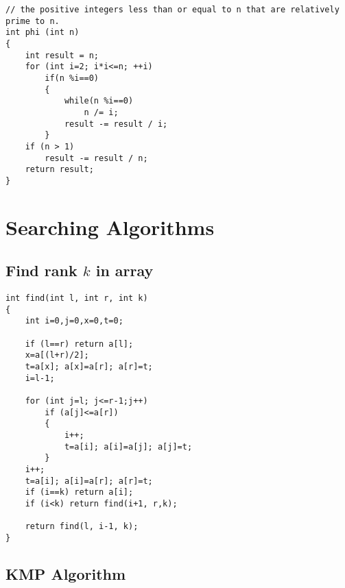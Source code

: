 \documentclass[a4paper]{article}
\begin{document}
\begin{verbatim}
// the positive integers less than or equal to n that are relatively prime to n.
int phi (int n)
{
	int result = n;
	for (int i=2; i*i<=n; ++i)
		if(n %i==0)
		{
			while(n %i==0)
				n /= i;
			result -= result / i;
		}
	if (n > 1)
		result -= result / n;
	return result;
}
\end{verbatim}

\section{Searching Algorithms}

\subsection{Find rank $k$ in array}

\begin{verbatim}
int find(int l, int r, int k)
{
	int i=0,j=0,x=0,t=0;

	if (l==r) return a[l];
	x=a[(l+r)/2];
	t=a[x]; a[x]=a[r]; a[r]=t;
	i=l-1;

	for (int j=l; j<=r-1;j++)
		if (a[j]<=a[r])
		{
			i++;
			t=a[i]; a[i]=a[j]; a[j]=t;
		}
	i++;
	t=a[i]; a[i]=a[r]; a[r]=t;
	if (i==k) return a[i];
	if (i<k) return find(i+1, r,k);

	return find(l, i-1, k);
}
\end{verbatim}

\subsection{KMP Algorithm}
\end{document}
